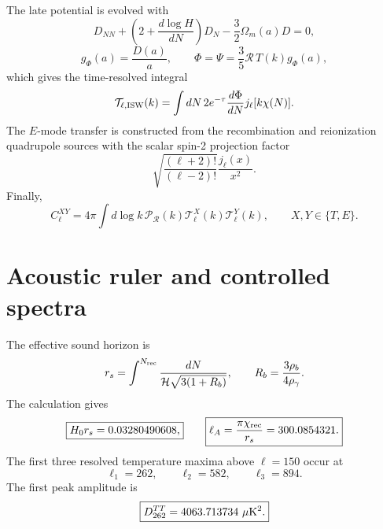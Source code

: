 The late potential is evolved with
\begin{equation}
D_{NN}
+\left(2+\frac{d\log H}{dN}\right)D_N
-\frac32\Omega_m(a)D=0,
\label{eq:trl-growth}
\end{equation}
\begin{equation}
g_\Phi(a)=\frac{D(a)}{a},
\qquad
\Phi=\Psi=\frac35\mathcal R\,T(k)g_\Phi(a),
\label{eq:trl-potential-growth}
\end{equation}
which gives the time-resolved integral
\begin{equation}
\mathcal T_{\ell,{\rm ISW}}(k)
=
\int dN\,
2e^{-\tau}
\frac{d\Phi}{dN}
 j_\ell[k\chi(N)].
\label{eq:trl-isw-integral}
\end{equation}
The $E$-mode transfer is constructed from the recombination and reionization quadrupole sources with the scalar spin-2 projection factor
\begin{equation}
\sqrt{\frac{(\ell+2)!}{(\ell-2)!}}
\frac{j_\ell(x)}{x^2}.
\label{eq:trl-spin2}
\end{equation}
Finally,
\begin{equation}
\boxed{
C_\ell^{XY}
=4\pi\int d\log k\,
\mathcal P_{\mathcal R}(k)
\mathcal T_\ell^X(k)
\mathcal T_\ell^Y(k),
\qquad
X,Y\in\{T,E\}.
}
\label{eq:trl-cl}
\end{equation}

\section{Acoustic ruler and controlled spectra}

The effective sound horizon is
\begin{equation}
r_s
=\int^{N_{\rm rec}}
\frac{dN}{\mathcal H\sqrt{3(1+R_b)}},
\qquad
R_b=\frac{3\rho_b}{4\rho_\gamma}.
\label{eq:trl-rs}
\end{equation}
The calculation gives
\begin{equation}
\boxed{H_0r_s=0.03280490608,}
\qquad
\boxed{\ell_A=\frac{\pi\chi_{\rm rec}}{r_s}=300.0854321.}
\label{eq:trl-acoustic-ruler}
\end{equation}
The first three resolved temperature maxima above $\ell=150$ occur at
\begin{equation}
\boxed{
\ell_1=262,
\qquad
\ell_2=582,
\qquad
\ell_3=894.
}
\label{eq:trl-peaks}
\end{equation}
The first peak amplitude is
\begin{equation}
\boxed{D_{262}^{TT}=4063.713734\ \mu{\rm K}^2.}
\label{eq:trl-first-peak}
\end{equation}


